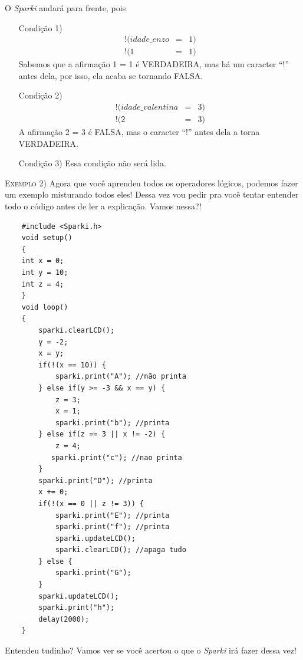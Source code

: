     O \textsl{Sparki} andará para frente, pois
    \begin{itemize}
        \item[Condição 1)]
        \begin{eqnarray}
        !(idade\_enzo & = & 1)\\
        !(1 & = & 1) \nonumber         \end{eqnarray}
        Sabemos que a afirmação 1 = 1 é VERDADEIRA, mas há um caracter ``!'' antes dela, por isso, ela acaba se tornando FALSA.
        \item[Condição 2)]
        \begin{eqnarray}
        !(idade\_valentina & = & 3)\\
        !(2 & = & 3) \nonumber
        \end{eqnarray}
        A afirmação 2 = 3 é FALSA, mas o caracter ``!'' antes dela a torna VERDADEIRA.
        \item[Condição 3)] Essa condição não será lida.
    \end{itemize}
    
     \textsc{Exemplo 2)} Agora que você aprendeu todos os operadores lógicos, podemos fazer um exemplo misturando todos eles! Dessa vez vou pedir pra você tentar entender todo o código antes de ler a explicação. Vamos nessa?!
     
     \begin{verbatim}
    #include <Sparki.h>
    void setup()
    {
    int x = 0;
    int y = 10;
    int z = 4;
    }
    void loop()
    {
        sparki.clearLCD();
        y = -2;
        x = y;
        if(!(x == 10)) {
            sparki.print("A"); //não printa
        } else if(y >= -3 && x == y) {
            z = 3;
            x = 1;
            sparki.print("b"); //printa
        } else if(z == 3 || x != -2) {
            z = 4;
           sparki.print("c"); //nao printa
        }
        sparki.print("D"); //printa
        x += 0;
        if(!(x == 0 || z != 3)) {
            sparki.print("E"); //printa
            sparki.print("f"); //printa
            sparki.updateLCD();
            sparki.clearLCD(); //apaga tudo
        } else {
            sparki.print("G");
        }
        sparki.updateLCD();
        sparki.print("h");
        delay(2000);
    }
    \end{verbatim}
     
    Entendeu tudinho? Vamos ver se você acertou o que o \textsl{Sparki} irá fazer dessa vez!
    
    
    
